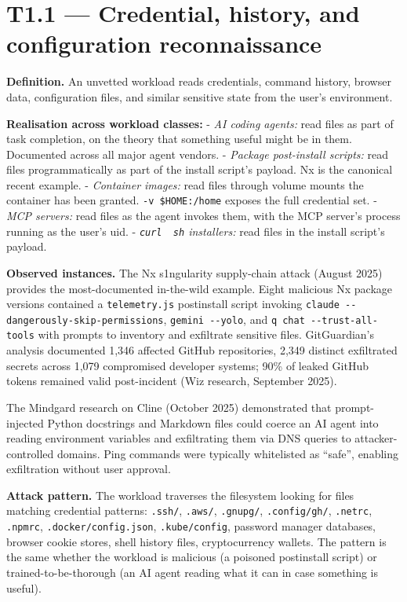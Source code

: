 \hypertarget{t1.1-credential-history-and-configuration-reconnaissance}{%
\section{T1.1 --- Credential, history, and configuration
reconnaissance}\label{t1.1-credential-history-and-configuration-reconnaissance}}

\textbf{Definition.} An unvetted workload reads credentials, command
history, browser data, configuration files, and similar sensitive state
from the user's environment.

\textbf{Realisation across workload classes:} - \emph{AI coding agents:}
read files as part of task completion, on the theory that something
useful might be in them. Documented across all major agent vendors. -
\emph{Package post-install scripts:} read files programmatically as part
of the install script's payload. Nx is the canonical recent example. -
\emph{Container images:} read files through volume mounts the container
has been granted. \texttt{-v\ \$HOME:/home} exposes the full credential
set. - \emph{MCP servers:} read files as the agent invokes them, with
the MCP server's process running as the user's uid. -
\emph{\texttt{curl\ \textbar{}\ sh} installers:} read files in the
install script's payload.

\textbf{Observed instances.} The Nx s1ngularity supply-chain attack
(August 2025) provides the most-documented in-the-wild example. Eight
malicious Nx package versions contained a \texttt{telemetry.js}
postinstall script invoking
\texttt{claude\ -\/-dangerously-skip-permissions},
\texttt{gemini\ -\/-yolo}, and \texttt{q\ chat\ -\/-trust-all-tools}
with prompts to inventory and exfiltrate sensitive files. GitGuardian's
analysis documented 1,346 affected GitHub repositories, 2,349 distinct
exfiltrated secrets across 1,079 compromised developer systems; 90\% of
leaked GitHub tokens remained valid post-incident (Wiz research,
September 2025).

The Mindgard research on Cline (October 2025) demonstrated that
prompt-injected Python docstrings and Markdown files could coerce an AI
agent into reading environment variables and exfiltrating them via DNS
queries to attacker-controlled domains. Ping commands were typically
whitelisted as ``safe'', enabling exfiltration without user approval.

\textbf{Attack pattern.} The workload traverses the filesystem looking
for files matching credential patterns: \texttt{.ssh/}, \texttt{.aws/},
\texttt{.gnupg/}, \texttt{.config/gh/}, \texttt{.netrc},
\texttt{.npmrc}, \texttt{.docker/config.json}, \texttt{.kube/config},
password manager databases, browser cookie stores, shell history files,
cryptocurrency wallets. The pattern is the same whether the workload is
malicious (a poisoned postinstall script) or trained-to-be-thorough (an
AI agent reading what it can in case something is useful).

